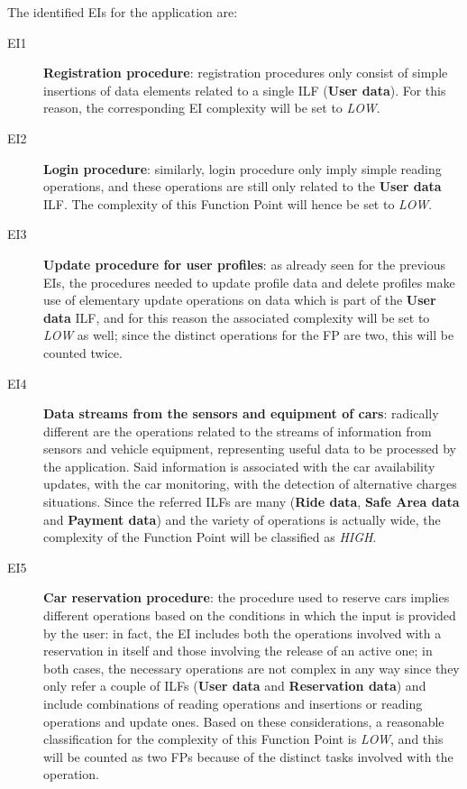 The identified EIs for the application are:
\begin{description}
\item[EI1] \textbf{Registration procedure}: registration procedures only consist of simple insertions of data elements related to a single ILF (\textbf{User data}). For this reason, the corresponding EI complexity will be set to \textit{LOW}.
\item[EI2] \textbf{Login procedure}: similarly, login procedure only imply simple reading operations, and these operations are still only related to the \textbf{User data} ILF. The complexity of this Function Point will hence be set to \textit{LOW}. 
\item[EI3] \textbf{Update procedure for user profiles}: as already seen for the previous EIs, the procedures needed to update profile data and delete profiles make use of elementary update operations on data which is part of the \textbf{User data} ILF, and for this reason the associated complexity will be set to \textit{LOW} as well; since the distinct operations for the FP are two, this will be counted twice.
\item[EI4] \textbf{Data streams from the sensors and equipment of cars}: radically different are the operations related to the streams of information from sensors and vehicle equipment, representing useful data to be processed by the application. Said information is associated with the car availability updates, with the car monitoring, with the detection of alternative charges situations. Since the referred ILFs are many (\textbf{Ride data}, \textbf{Safe Area data} and \textbf{Payment data}) and the variety of operations is actually wide, the complexity of the Function Point will be classified as \textit{HIGH}.
\item[EI5] \textbf{Car reservation procedure}: the procedure used to reserve cars implies different operations based on the conditions in which the input is provided by the user: in fact, the EI includes both the operations involved with a reservation in itself and those involving the release of an active one; in both cases, the necessary operations are not complex in any way since they only refer a couple of ILFs (\textbf{User data} and \textbf{Reservation data}) and include combinations of reading operations and insertions or reading operations and update ones. Based on these considerations, a reasonable classification for the complexity of this Function Point is \textit{LOW}, and this will be counted as two FPs because of the distinct tasks involved with the operation.

\end{description}

